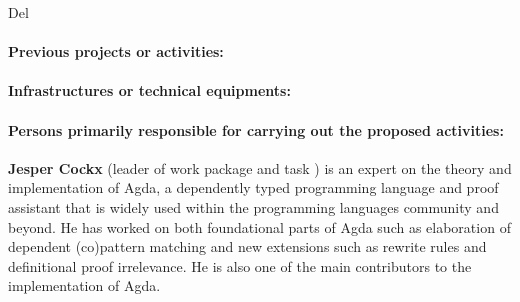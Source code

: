 \begin{sitedescription}{Del}

\paragraph*{Previous projects or activities:}

\paragraph*{Infrastructures or technical equipments:}

\paragraph*{Persons primarily responsible for carrying out the proposed activities:}

\begin{compactitem}

  \item{\bf Jesper Cockx} (leader of work package 
  and task ) is an expert on the theory and
  implementation of Agda, a dependently typed programming language and
  proof assistant that is widely used within the programming languages
  community and beyond. He has worked on both foundational parts of
  Agda such as elaboration of dependent (co)pattern matching and new
  extensions such as rewrite rules and definitional proof
  irrelevance. He is also one of the main contributors to the
  implementation of Agda.

\end{compactitem}




\end{sitedescription}

